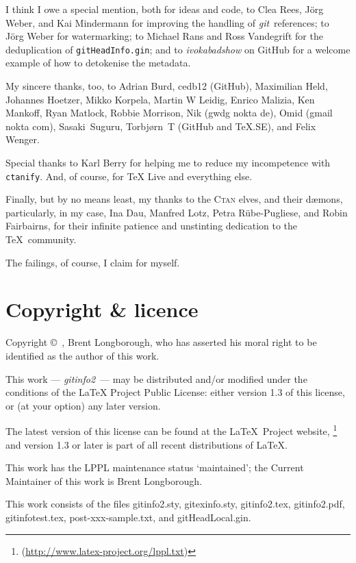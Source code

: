 \documentclass[a4paper,12pt,twoside,openany]{memoir}
\newcommand{\sfit}[1]{\textit{#1}}
\newcommand{\git}{\sfit{git}}
\newcommand{\tpname}{\sfit{gitinfo2}}
\newcommand{\ginname}{gitHeadInfo.gin}
\newcommand{\metaname}{\texttt{\ginname}}
\begin{document}
I think I owe a special mention, both for ideas and code,
to Clea Rees, Jörg Weber, and Kai Mindermann
for improving the handling of \git\ references;
to Jörg Weber for watermarking;
to Michael Rans and Ross Vandegrift for
the deduplication of \metaname;
and to \sfit{ivokabadshow} on GitHub 
for a welcome example of how to detokenise the metadata.

My sincere thanks, too, to
Adrian Burd,
cedb12 (GitHub),
Maximilian Held,
Johannes Hoetzer,
Mikko Korpela,
Martin W Leidig,
Enrico Malizia,
Ken Mankoff,
Ryan Matlock,
Robbie Morrison,
Nik (gwdg nokta de),
Omid (gmail nokta com),
Sasaki~Suguru,
Tor\-bjørn~T (GitHub and TeX.SE),
and
Felix Wenger.

Special thanks to Karl Berry for helping me to
reduce my incompetence with \texttt{ctanify}.
And, of course, for \TeX{} Live and everything else.

Finally, but by no means least,
my thanks to the \textsc{Ctan} elves, and their dæmons,
particularly, in my case,
Ina Dau,
Manfred Lotz, 
Petra Rübe-Pugliese,
and 
Robin Fairbairns, 
for their infinite patience and unstinting
dedication to the \TeX\ community.

The failings, of course, I claim for myself.

\clearpage
\section{Copyright \& licence}
Copyright \copyright\ , Brent Longborough,
who has asserted his moral right
to be identified as the author of this work.

This work --- \tpname\ --- may be distributed and/or modified under the
conditions of the LaTeX Project Public License: either version 1.3
of this license, or (at your option) any later version.

The latest version of this license can be found
at the \LaTeX\ Project website,%
\footnote{(\url{http://www.latex-project.org/lppl.txt})}
and version 1.3 or later is part of all recent distributions of
\LaTeX.

This work has the LPPL maintenance status `maintained';
the Current Maintainer of this work is Brent Longborough.

This work consists of the files
gitinfo2.sty, gitexinfo.sty, gitinfo2.tex, gitinfo2.pdf,
gitinfotest.tex, post-xxx-sample.txt,
and gitHeadLocal.gin.

\end{document}
